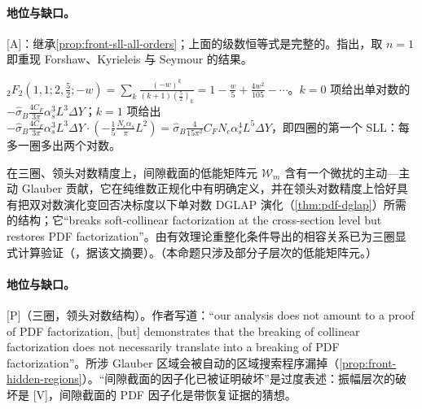 \paragraph{地位与缺口。}[A]：继承\cref{prop:front-sll-all-orders}；上面的级数恒等式是完整的。\cite{Becher:2021zkk}指出，取 $n=1$ 即重现 Forshaw、Kyrieleis 与 Seymour 的结果\cite{ForshawKyrieleisSeymour2006}。

\begin{example}[由闭式读出第一个超领头对数]\label{ex:front-sll-first}
${}_2F_2(1,1;2,\frac52;-w)=\sum_k\frac{(-w)^k}{(k+1)(\frac52)_k}=1-\frac w5+\frac{4w^2}{105}-\cdots$。$k=0$ 项给出单对数的 $-\hat\sigma_B\frac{4C_F}{3\pi}\alpha_s^3L^3\Delta Y$；$k=1$ 项给出 $-\hat\sigma_B\frac{4C_F}{3\pi}\alpha_s^3L^3\Delta Y\cdot(-\frac15\frac{N_c\alpha_s}{\pi}L^2)=\hat\sigma_B\frac{4}{15\pi^2}C_FN_c\alpha_s^4L^5\Delta Y$，即四圈的第一个 SLL：每多一圈多出两个对数。
\end{example}

\begin{proposition}\label{prop:front-restoration}
在三圈、领头对数精度上，间隙截面的低能矩阵元 $\mathcal W_m$ 含有一个微扰的主动—主动 Glauber 贡献，它在纯维数正规化中有明确定义，并在领头对数精度上恰好具有把双对数演化变回否决标度以下单对数 DGLAP 演化（\cref{thm:pdf-dglap}）所需的结构；它“breaks soft-collinear factorization at the cross-section level but restores PDF factorization”\cite{Becher:2024kmk}。由有效理论重整化条件导出的相容关系已为三圈显式计算验证（\cite{Becher:2025igg}，据该文摘要）。（本命题只涉及部分子层次的低能矩阵元。）
\end{proposition}

\paragraph{地位与缺口。}[P]（三圈，领头对数结构）。作者写道：“our analysis does not amount to a proof of PDF factorization, [but] demonstrates that the breaking of collinear factorization does not necessarily translate into a breaking of PDF factorization”。所涉 Glauber 区域会被自动的区域搜索程序漏掉（\cref{prop:front-hidden-regions}）。“间隙截面的因子化已被证明破坏”是过度表述：振幅层次的破坏是 [V]，间隙截面的 PDF 因子化是带恢复证据的猜想。

